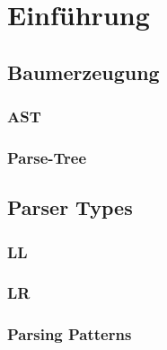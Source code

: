 \documentclass[../InterneDSLs.tex]{subfiles}
\begin{document}
\section{Einführung}

\subsection{Baumerzeugung}

\subsubsection{AST}
\subsubsection{Parse-Tree}

\subsection{Parser Types}
\subsubsection{LL}
\subsubsection{LR}

\subsubsection{Parsing Patterns}
\end{document}
